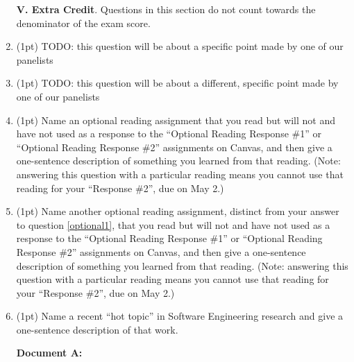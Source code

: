 \documentclass{report}
\newif\ifkey
\newcommand{\answerlong}[1]{\ifkey\color{red}\textbf{#1}\color{black}\else\vspace{0.5in}\fi\xspace}
\newcommand{\ecpts}[1]{\addtocounter{ecpoints}{#1}(#1pt)}
\begin{document}
\begin{spacing}{1.4}
\begin{enumerate}[leftmargin=*]
    \newpage
    
    \textbf{V. Extra Credit}. Questions in this section do not count towards the denominator of the exam score.

  \item \ecpts{1} TODO: this question will be about a specific point made by one of our panelists
    \answerlong{TODO}

  \item \ecpts{1} TODO: this question will be about a different, specific point made by one of our panelists
    \answerlong{TODO}
  
  \item \ecpts{1} \label{optional1} Name an optional reading assignment that you read but will not and have not used as a response to the ``Optional Reading Response \#1''
    or ``Optional Reading Response \#2'' assignments on Canvas, and then give a one-sentence description of something you learned from that reading.
    (Note: answering this question with a particular reading means you cannot use that reading for your ``Response \#2'', due on May 2.)
    \answerlong{Answers vary.}
    
  \item \ecpts{1} Name another optional reading assignment, distinct from your answer to question \ref{optional1},
    that you read but will not and have not used as a response to the ``Optional Reading Response \#1''
    or ``Optional Reading Response \#2'' assignments on Canvas, and then give a one-sentence description of something you learned from that reading.
    (Note: answering this question with a particular reading means you cannot use that reading for your ``Response \#2'', due on May 2.)
    \answerlong{Answers vary.}
    
  \item \ecpts{1} Name a recent ``hot topic'' in Software Engineering research and give a one-sentence description of that work.
    \answerlong{Expected answers are the topics covered in class on 20 April.}
    
    \newpage

    \textbf{Document A:}
    

\end{enumerate}
\end{spacing}
\end{document}
